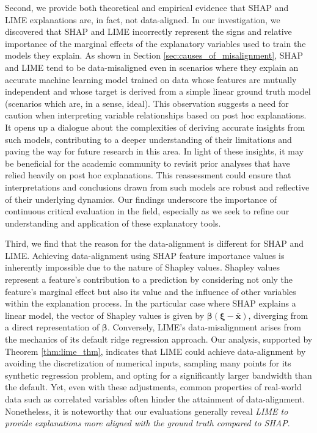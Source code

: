 \documentclass[mnsc,blindrev]{informs3}
\begin{document}
       Second, we provide both theoretical and empirical evidence that SHAP and LIME explanations are, in fact, not data-aligned. In our investigation, we discovered that SHAP and LIME incorrectly represent the signs and relative importance of the marginal effects of the explanatory variables used to train the models they explain. As shown in Section \ref{sec:causes_of_misalignment}, SHAP and LIME tend to be data-misaligned even in scenarios where they explain an accurate machine learning model trained on data whose features are mutually independent and whose target is derived from a simple linear ground truth model (scenarios which are, in a sense, ideal). This observation suggests a need for caution when interpreting variable relationships based on post hoc explanations. It opens up a dialogue about the complexities of deriving accurate insights from such models, contributing to a deeper understanding of their limitations and paving the way for future research in this area. In light of these insights, it may be beneficial for the academic community to revisit prior analyses that have relied heavily on post hoc explanations. This reassessment could ensure that interpretations and conclusions drawn from such models are robust and reflective of their underlying dynamics. Our findings underscore the importance of continuous critical evaluation in the field, especially as we seek to refine our understanding and application of these explanatory tools. %
        
        Third, we find that the reason for the data-alignment is different for SHAP and LIME. Achieving data-alignment using SHAP feature importance values is inherently impossible due to the nature of Shapley values. Shapley values represent a feature's contribution to a prediction by considering not only the feature's marginal effect but also its value and the influence of other variables within the explanation process. In the particular case where SHAP explains a linear model, the vector of Shapley values is given by $\boldsymbol{\beta}(\boldsymbol{\xi}-\bar{\mathbf{x}})$, diverging from a direct representation of $\boldsymbol{\beta}$. Conversely, LIME's data-misalignment arises from the mechanics of its default ridge regression approach. Our analysis, supported by Theorem \ref{thm:lime_thm}, indicates that LIME could achieve data-alignment by avoiding the discretization of numerical inputs, sampling many points for its synthetic regression problem, and opting for a significantly larger bandwidth than the default. Yet, even with these adjustments, common properties of real-world data such as correlated variables often hinder the attainment of data-alignment. Nonetheless, it is noteworthy that our evaluations generally reveal \textit{LIME to provide explanations more aligned with the ground truth compared to SHAP}.
 
\end{document}
